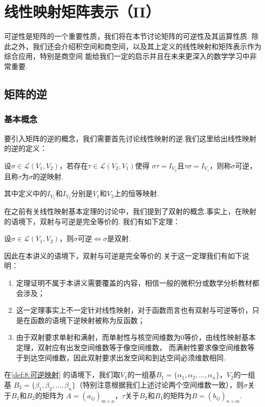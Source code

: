\chapter{线性映射矩阵表示（II）}

可逆性是矩阵的一个重要性质，我们将在本节讨论矩阵的可逆性及其运算性质.
除此之外，我们还会介绍积空间和商空间，以及其上定义的线性映射和矩阵表示作为综合应用，特别是商空间
能给我们一定的启示并且在未来更深入的数学学习中非常重要.

\section{矩阵的逆}
\subsection{基本概念}
要引入矩阵的逆的概念，我们需要首先讨论线性映射的逆.我们这里给出线性映射的逆的定义：
\begin{definition}\label{def:8:可逆映射}
    设$\sigma \in \mathcal{L}(V_1,V_2)$，若存在$\tau \in \mathcal{L}(V_2,V_1)$使得
    $\sigma \tau = I_{V_2}$且$\tau \sigma = I_{V_1}$，则称$\sigma$可逆，且称$\tau$为$\sigma$的逆映射.
\end{definition}
其中定义中的$I_{V_1}$和$I_{V_2}$分别是$V_1$和$V_2$上的恒等映射.

在之前有关线性映射基本定理的讨论中，我们提到了双射的概念.事实上，在映射的语境下，双射与可逆是完全等价的. 我们有如下定理：
\begin{theorem}
    设$\sigma \in \mathcal{L}(V_1,V_2)$，则$\sigma$可逆$\iff \sigma$是双射.
\end{theorem}

因此在本讲义的语境下，双射与可逆是完全等价的.关于这一定理我们有如下说明：
\begin{enumerate}
    \item 定理证明不属于本讲义需要覆盖的内容，相信一般的微积分或数学分析教材都会涉及；
    \item 这一定理事实上不一定针对线性映射，对于函数而言也有双射与可逆等价，只是在函数的语境下逆映射被称为反函数；
    \item 由于双射要求单射和满射，而单射性与核空间维数为0等价，由线性映射基本定理，双射应有出发空间维数等于像空间维数，
    而满射性要求像空间维数等于到达空间维数，因此双射要求出发空间和到达空间必须维数相同.
\end{enumerate}

在\autoref{def:8:可逆映射} 的语境下，我们取$V_1$的一组基$B_1=\{\alpha_1,\alpha_2,\ldots,\alpha_n\}$，$V_2$的一组基
$B_2=\{\beta_1,\beta_2,\ldots,\beta_n\}$（特别注意根据我们上述讨论两个空间维数一致），则$\sigma$关于$B_1$和$B_2$的矩阵为
$A=(a_{ij})_{m \times n}$，$\tau$关于$B_2$和$B_1$的矩阵为$B=(b_{ij})_{n \times m}$.

